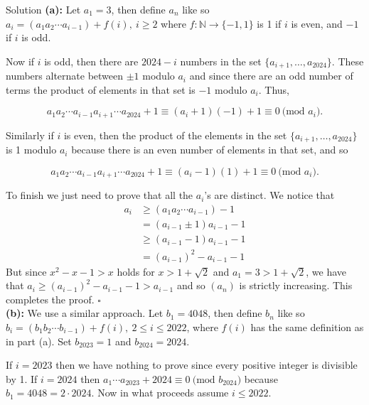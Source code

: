\documentclass{article}
\begin{document}
\begin{solution}{Solution}
\textbf{(a):} Let $a_1 = 3$, then define $a_n$ like so
$
a_i = (a_1 a_2 \cdots a_{i-1}) + f(i), \ i \geq 2
$
where $f : \mathbb{N} \rightarrow \{-1, 1\}$ is 1 if $i$ is even, and $-1$
if $i$ is odd. \vspace{0.2cm}

Now if $i$ is odd, then there are $2024 - i$ numbers in the set
$\{ a_{i+1}, \ldots, a_{2024} \}$. These numbers alternate between
$\pm 1$ modulo $a_i$ and since there are an odd number of terms the
product of elements in that set is $-1$ modulo $a_i$. Thus,

$$
a_1 a_2 \cdots a_{i-1}a_{i+1} \cdots a_{2024} + 1
\equiv
(a_i + 1)(-1) + 1 \equiv
0 \ \text{(mod } a_i).
$$

Similarly if $i$ is even, then the product of the elements in the set
$\{ a_{i+1}, \ldots, a_{2024} \}$ is 1 modulo $a_i$ because there is an
even number of elements in that set, and so

$$
a_1 a_2 \cdots a_{i-1}a_{i+1} \cdots a_{2024} + 1
\equiv
(a_i - 1)(1) + 1 \equiv
0 \ \text{(mod } a_i).
$$

To finish we just need to prove that all the $a_i$'s are distinct. We
notice that
\begin{align*}
a_i &\geq (a_1 a_2 \cdots a_{i-1}) - 1\\
&= (a_{i-1} \pm 1)a_{i-1} - 1\\
&\geq (a_{i-1} - 1)a_{i-1} - 1\\
&= (a_{i-1})^2 - a_{i-1} - 1
\end{align*}
But since $x^2 - x - 1 > x$ holds for $x > 1+\sqrt{2}$ and $a_1 = 3 >
1 + \sqrt{2}$, we have that $a_i \geq (a_{i-1})^2 - a_{i-1} - 1 > a_{i-1}$
and so $(a_n)$ is strictly increasing. This completes the proof.
$\square$\\

\textbf{(b):} We use a similar approach. Let $b_1 = 4048$, then
define $b_n$ like so $b_i = (b_1 b_2 \cdots b_{i-1}) + f(i), \ 2 \leq i \leq
2022$, where $f(i)$ has the same definition as in part (a).
Set $b_{2023} = 1$ and $b_{2024} = 2024$. \vspace{0.2cm}

If $i = 2023$ then we have nothing to prove since every positive integer
is divisible by 1. If $i = 2024$ then $a_1\cdots a_{2023} + 2024 \equiv
0 \ \text{(mod } b_{2024})$ because $b_1 = 4048 = 2\cdot 2024$. Now in what
proceeds assume $i \leq 2022$. \vspace{0.2cm}


\end{solution}
\end{document}
